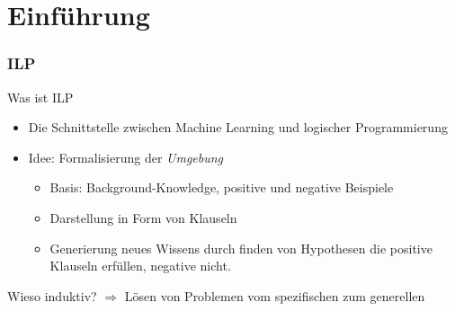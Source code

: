\section{Einführung}

\begin{frame}
	\frametitle{ILP}

	\begin{block}{Was ist ILP}
		\begin{itemize}
			\item Die Schnittstelle zwischen Machine Learning und logischer Programmierung
			\item {Idee: Formalisierung der \textit{Umgebung}
				\begin{itemize}
					\item Basis: Background-Knowledge, positive und negative Beispiele
					\item Darstellung in Form von Klauseln
					\item Generierung neues Wissens durch finden von Hypothesen die positive
					Klauseln erfüllen, negative nicht.
				\end{itemize}
			}
		\end{itemize}
	\end{block}
	Wieso induktiv?
	$\Rightarrow$ Lösen von Problemen vom spezifischen zum generellen
\end{frame}

